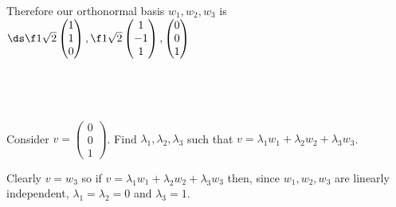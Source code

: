 \documentclass[a4paper]{article}
\begin{document}
Therefore our orthonormal basis $w_1, w_2, w_3$ is $\ds \f1{\sqrt2} \begin{pmatrix}1\\ 1\\ 0\end{pmatrix}, \f1{\sqrt2} \begin{pmatrix}1\\ -1\\ 1\end{pmatrix}, \begin{pmatrix}0\\ 0\\ 1\end{pmatrix}$

\newpage
\subsection{~} %

\begin{questionbody}
Consider $v = \begin{pmatrix}0\\ 0\\ 1\end{pmatrix}$. Find $\lambda_1, \lambda_2, \lambda_3$ such that $v = \lambda_1 w_1 + \lambda_2 w_2 + \lambda_3 w_3$.
\end{questionbody}

Clearly $v = w_3$ so if $v = \lambda_1 w_1 + \lambda_2 w_2 + \lambda_3 w_3$ then, since $w_1, w_2, w_3$ are linearly independent, $\lambda_1 = \lambda_2 = 0$ and $\lambda_3 = 1$.


\end{document}
